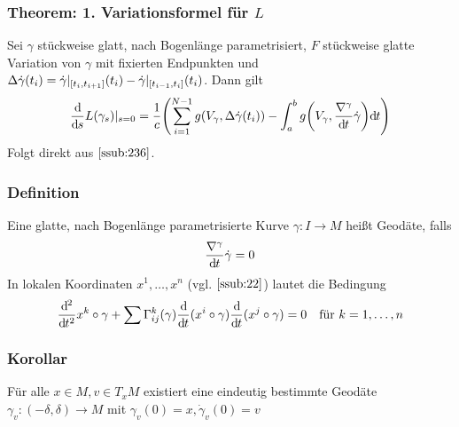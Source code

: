 \subsubsection{Theorem: 1. Variationsformel für $L$}
\label{ssub:237}
Sei $\gamma$ stückweise glatt, nach Bogenlänge parametrisiert, $F$ stückweise glatte Variation von $\gamma$ mit fixierten Endpunkten und $\Delta \dot{\gamma}(t_i) = \dot{\gamma}\vert_{[t_i,t_{i+1}]}(t_i) -\dot{\gamma}\vert_{[t_{i-1},t_i]}(t_i)$. Dann gilt
\[
\frac{\mathd}{\mathd s} L(\gamma_s)\vert_{s=0} = \frac{1}{c} \enbrace*{\sum_{i=1}^{N-1} g\enbrace*{V_\gamma,\Delta \dot{\gamma}(t_i)} - \int_a^b g\enbrace*{V_\gamma,\frac{\nabla^\gamma}{\mathd t}\dot{\gamma}} \mathd t}
\]
Folgt direkt aus $\ref{ssub:236}$.

\subsubsection[Definition: Geodäte]{Definition}
\label{ssub:238}
Eine glatte, nach Bogenlänge parametrisierte Kurve $\gamma:I\to M$ heißt Geodäte, falls
\[
\frac{\nabla^\gamma}{\mathrm{d}\mkern-1.0mu t} \dot{\gamma} = 0
\]
In lokalen Koordinaten $x^1,\ldots,x^n$ (vgl. $\ref{ssub:22}$) lautet die Bedingung
\[
\frac{\mathrm{d}\mkern-1.0mu^2}{\mathrm{d}\mkern-1.0mu t^2} x^k\circ \gamma + \sum \Gamma_{ij}^k(\gamma) \frac{\mathrm{d}\mkern-1.0mu}{\mathrm{d}\mkern-1.0mu t}(x^i\circ \gamma)\frac{\mathrm{d}\mkern-1.0mu}{\mathrm{d}\mkern-1.0mu t}(x^j\circ \gamma) = 0\quad \text{für}\ k=1,\ldots,n
\]

\subsubsection{Korollar}
\label{ssub:239}
Für alle $x\in M, v\in T_x M$ existiert eine eindeutig bestimmte Geodäte $\gamma_v:(-\delta,\delta)\to M$ mit $\gamma_v(0) = x, \dot{\gamma}_v (0) = v$



